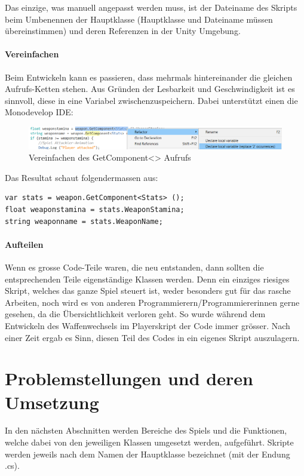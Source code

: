 Das einzige, was manuell angepasst werden muss, ist der Dateiname des Skripts beim Umbenennen der Hauptklasse (Hauptklasse und Dateiname müssen übereinstimmen) und deren Referenzen in der Unity Umgebung.

\paragraph{Vereinfachen}
Beim Entwickeln kann es passieren, dass mehrmals hintereinander die gleichen Aufrufs-Ketten stehen. Aus Gründen der Lesbarkeit und Geschwindigkeit ist es sinnvoll, diese in eine Variabel zwischenzuspeichern. Dabei unterstützt einen die Monodevelop IDE:

\begin{figure}[H]
\includegraphics[scale=0.67]{screenshots/refactor.png}
\caption{Vereinfachen des GetComponent<> Aufrufs}
\end{figure}

Das Resultat schaut folgendermassen aus:

\begin{lstlisting}[caption={Code nach Vereinfachung}]
var stats = weapon.GetComponent<Stats> ();
float weaponstamina = stats.WeaponStamina;
string weaponname = stats.WeaponName;
\end{lstlisting}

\paragraph{Aufteilen}
Wenn es grosse Code-Teile waren, die neu entstanden, dann sollten die entsprechenden Teile eigenständige Klassen werden. Denn ein einziges riesiges Skript, welches das ganze Spiel steuert ist, weder besonders gut für das rasche Arbeiten, noch wird es von anderen Programmierern/Programmiererinnen gerne gesehen, da die Übersichtlichkeit verloren geht.
So wurde während dem Entwickeln des Waffenwechsels im Playerskript der Code immer grösser. Nach einer Zeit ergab es Sinn, diesen Teil des Codes in ein eigenes Skript auszulagern.
\section{Problemstellungen und deren Umsetzung}
In den nächsten Abschnitten werden Bereiche des Spiels und die Funktionen, welche dabei von den jeweiligen Klassen umgesetzt werden, aufgeführt. Skripte werden jeweils nach dem Namen der Hauptklasse bezeichnet (mit der Endung .cs).
